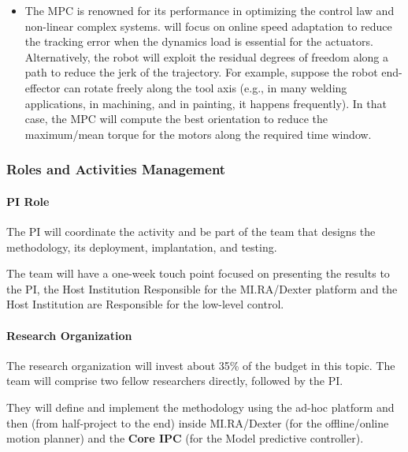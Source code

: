 \begin{itemize}
  \begin{itemize}
  \item
    The MPC is renowned for its performance in optimizing the control
    law and non-linear complex systems.  will focus on
    online speed adaptation to reduce the tracking error when the
    dynamics load is essential for the actuators. Alternatively, the
    robot will exploit the residual degrees of freedom along a path to
    reduce the jerk of the trajectory. For example, suppose the robot
    end-effector can rotate freely along the tool axis (e.g., in many
    welding applications, in machining, and in painting, it happens
    frequently). In that case, the MPC will compute the best orientation
    to reduce the maximum/mean torque for the motors along the required
    time window.
  \end{itemize}
\end{itemize}

\subsubsection{\texorpdfstring{Roles and Activities Management
}{Roles and Activities Management }}\label{roles-and-activities-management-1}

\paragraph{PI Role}\label{pi-role-1}

The PI will coordinate the activity and be part of the team that designs
the methodology, its deployment, implantation, and testing.

The team will have a one-week touch point focused on presenting the
results to the PI, the Host Institution Responsible for the MI.RA/Dexter
platform and the Host Institution are Responsible for the low-level
control.

\paragraph{Research Organization}\label{research-organization-1}

The research organization will invest about 35\% of the budget in this
topic. The team will comprise two fellow researchers directly, followed
by the PI.

They will define and implement the methodology using the ad-hoc platform
and then (from half-project to the end) inside MI.RA/Dexter (for the
offline/online motion planner) and the \textbf{Core IPC} (for the Model
predictive controller).

